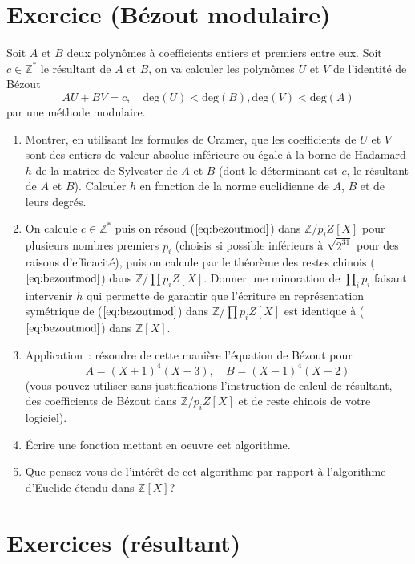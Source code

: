 \documentclass[a4paper,11pt]{book}
\begin{document}
\begin{giacjshere}
\section{Exercice (Bézout modulaire)}
Soit $A$ et $B$ deux polynômes à coefficients entiers et premiers
entre eux. Soit $c \in \mathbb{Z}^* $ le résultant de $A$ et $B$,
on va calculer les polynômes $U$ et $V$ de l'identité de Bézout 
\begin{equation} \label{eq:bezoutmod}
 A U + B V = c , \quad \mbox{deg}(U)<\mbox{deg}(B), \mbox{deg}(V)<\mbox{deg}(A)
\end{equation}
par une méthode modulaire.
\begin{enumerate}
\item Montrer, en utilisant les formules de Cramer,
que les coefficients de $U$ et $V$ sont des entiers de
valeur absolue inférieure ou égale à la borne de Hadamard $h$ de
la matrice de Sylvester de $A$ et $B$ (dont le déterminant est $c$,
le résultant de $A$ et $B$). Calculer $h$ en fonction
de la norme euclidienne de $A$, $B$ et de leurs degr\'es. 
\item On calcule $c \in \mathbb{Z}^*$ puis on
résoud (\(\ref{eq:bezoutmod}\)) dans $\mathbb{Z}/p_i Z[X]$ pour
plusieurs nombres premiers $p_i$ (choisis si possible inférieurs 
à $\sqrt{2^{31}}$ pour des raisons d'efficacité), puis on calcule par le
théorème des restes chinois (\(\ref{eq:bezoutmod}\)) 
dans $\mathbb{Z}/\prod p_i Z[X]$. Donner une minoration de 
$\prod_i p_i$ faisant intervenir $h$ qui permette de garantir
que l'écriture en représentation symétrique de (\(\ref{eq:bezoutmod}\))
dans $\mathbb{Z}/\prod p_i Z[X]$ est identique \`a (\(\ref{eq:bezoutmod}\)) dans $\mathbb{Z}[X]$.
\item Application~: résoudre de cette manière l'équation de
Bézout pour 
\[ A=(X+1)^4(X-3), \quad B=(X-1)^4(X+2)\] 
(vous pouvez utiliser
sans justifications l'instruction de calcul de r\'esultant,
des coefficients de Bézout dans $\mathbb{Z}/p_iZ[X]$ et 
de reste chinois de votre logiciel).
\item \'Ecrire une fonction mettant en oeuvre cet algorithme.
\item Que pensez-vous de l'intérêt de cet algorithme par rapport à
l'algorithme d'Euclide étendu dans $\mathbb{Z}[X]$?
\end{enumerate}

\pagebreak

\section{Exercices (r\'esultant)}


\end{giacjshere}
\end{document}
